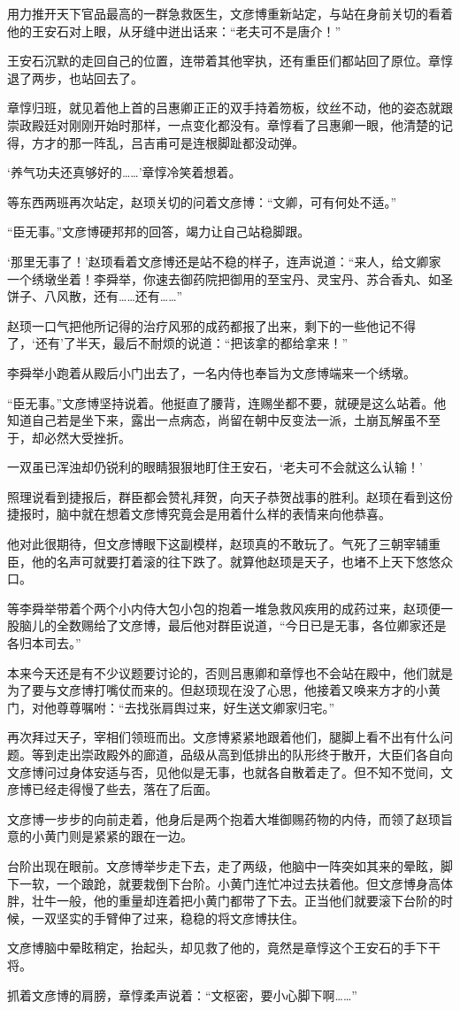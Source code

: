 用力推开天下官品最高的一群急救医生，文彦博重新站定，与站在身前关切的看着他的王安石对上眼，从牙缝中迸出话来：“老夫可不是唐介！”

王安石沉默的走回自己的位置，连带着其他宰执，还有重臣们都站回了原位。章惇退了两步，也站回去了。

章惇归班，就见着他上首的吕惠卿正正的双手持着笏板，纹丝不动，他的姿态就跟崇政殿廷对刚刚开始时那样，一点变化都没有。章惇看了吕惠卿一眼，他清楚的记得，方才的那一阵乱，吕吉甫可是连根脚趾都没动弹。

‘养气功夫还真够好的……’章惇冷笑着想着。

等东西两班再次站定，赵顼关切的问着文彦博：“文卿，可有何处不适。”

“臣无事。”文彦博硬邦邦的回答，竭力让自己站稳脚跟。

‘那里无事了！’赵顼看着文彦博还是站不稳的样子，连声说道：“来人，给文卿家一个绣墩坐着！李舜举，你速去御药院把御用的至宝丹、灵宝丹、苏合香丸、如圣饼子、八风散，还有……还有……”

赵顼一口气把他所记得的治疗风邪的成药都报了出来，剩下的一些他记不得了，‘还有’了半天，最后不耐烦的说道：“把该拿的都给拿来！”

李舜举小跑着从殿后小门出去了，一名内侍也奉旨为文彦博端来一个绣墩。

“臣无事。”文彦博坚持说着。他挺直了腰背，连赐坐都不要，就硬是这么站着。他知道自己若是坐下来，露出一点病态，尚留在朝中反变法一派，土崩瓦解虽不至于，却必然大受挫折。

一双虽已浑浊却仍锐利的眼睛狠狠地盯住王安石，‘老夫可不会就这么认输！’

照理说看到捷报后，群臣都会赞礼拜贺，向天子恭贺战事的胜利。赵顼在看到这份捷报时，脑中就在想着文彦博究竟会是用着什么样的表情来向他恭喜。

他对此很期待，但文彦博眼下这副模样，赵顼真的不敢玩了。气死了三朝宰辅重臣，他的名声可就要打着滚的往下跌了。就算他赵顼是天子，也堵不上天下悠悠众口。

等李舜举带着个两个小内侍大包小包的抱着一堆急救风疾用的成药过来，赵顼便一股脑儿的全数赐给了文彦博，最后他对群臣说道，“今日已是无事，各位卿家还是各归本司去。”

本来今天还是有不少议题要讨论的，否则吕惠卿和章惇也不会站在殿中，他们就是为了要与文彦博打嘴仗而来的。但赵顼现在没了心思，他接着又唤来方才的小黄门，对他尊尊嘱咐：“去找张肩舆过来，好生送文卿家归宅。”

再次拜过天子，宰相们领班而出。文彦博紧紧地跟着他们，腿脚上看不出有什么问题。等到走出崇政殿外的廊道，品级从高到低排出的队形终于散开，大臣们各自向文彦博问过身体安适与否，见他似是无事，也就各自散着走了。但不知不觉间，文彦博已经走得慢了些去，落在了后面。

文彦博一步步的向前走着，他身后是两个抱着大堆御赐药物的内侍，而领了赵顼旨意的小黄门则是紧紧的跟在一边。

台阶出现在眼前。文彦博举步走下去，走了两级，他脑中一阵突如其来的晕眩，脚下一软，一个踉跄，就要栽倒下台阶。小黄门连忙冲过去扶着他。但文彦博身高体胖，壮牛一般，他的重量却连着把小黄门都带了下去。正当他们就要滚下台阶的时候，一双坚实的手臂伸了过来，稳稳的将文彦博扶住。

文彦博脑中晕眩稍定，抬起头，却见救了他的，竟然是章惇这个王安石的手下干将。

抓着文彦博的肩膀，章惇柔声说着：“文枢密，要小心脚下啊……”

